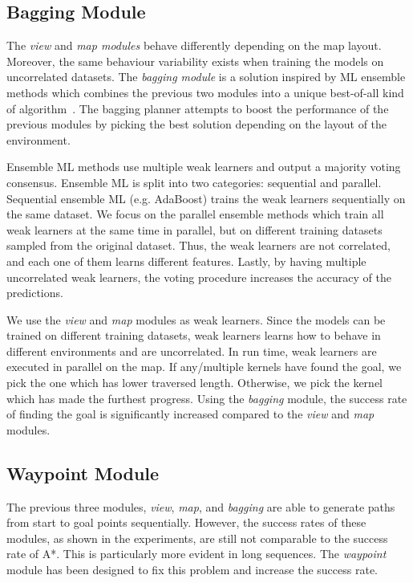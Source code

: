 \documentclass[journal, twocolumn]{IEEEtran}
\begin{document}
\subsection{Bagging Module} \label{sec:bagging}
%
The \emph{view} and \emph{map modules} behave differently depending on the map layout. Moreover, the same behaviour variability exists when training the models on uncorrelated datasets.
%
The \emph{bagging module} 
is a solution inspired by ML ensemble methods which combines the previous 
two modules into a unique best-of-all kind of algorithm~\cite{dietterich2000ensemble}. 
%
The bagging planner attempts to boost the performance of the previous modules by picking the best solution depending on the layout of the environment.
%

Ensemble ML methods use multiple weak learners and output a majority voting consensus. Ensemble ML is split into two categories: sequential and parallel. Sequential ensemble ML (e.g. AdaBoost) trains the weak learners sequentially on the same dataset.
We focus on the parallel ensemble methods which train all weak learners at the same time in parallel, but on different training datasets sampled from the original dataset. Thus, the weak learners are not correlated, and each one of them learns different features. Lastly, by having multiple uncorrelated weak learners, the voting procedure increases the accuracy of the predictions. 
%

We use the \emph{view} and \emph{map} modules as weak learners. Since the models can be trained on different training datasets, weak learners learns how to behave in different environments and are uncorrelated. In run time, weak learners are executed in parallel on the map. If any/multiple kernels have found the goal, we pick the one which has lower traversed length. Otherwise, we pick the kernel which has made the furthest progress. Using the \emph{bagging} module, the success rate of finding the goal is significantly increased compared to the \emph{view} and \emph{map} modules. 

\subsection{Waypoint Module}
The previous three modules, \emph{view}, \emph{map}, and \emph{bagging} are able to generate paths from start to goal points sequentially. However, the success rates of these modules, as shown in the experiments, are still not comparable to the success rate of A*. This is particularly more evident in long sequences. The \emph{waypoint} module has been designed to fix this problem and increase the success rate.
\end{document}
